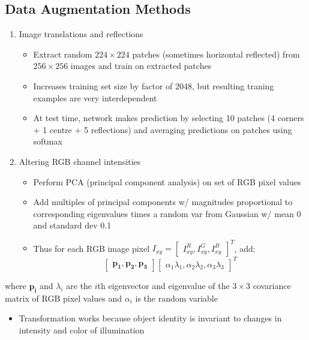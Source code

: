 \documentclass[a4paper,12pt]{article}
\newcommand{\vect}[1]{\mathbf{#1}}
\begin{document}
\subsection{Data Augmentation Methods}
\begin{enumerate}
  \item Image translations and reflections
  \begin{itemize}
    \item Extract random $224\times 224$ patches (sometimes horizontal reflected) from $256\times 256$ images and train on extracted patches
    \item Increases training set size by factor of 2048, but resulting traning examples are very interdependent
    \item At test time, network makes prediction by selecting 10 patches (4 corners + 1 centre + 5 reflections) and averaging predictions on patches using softmax
  \end{itemize}
  \item Altering RGB channel intensities
  \begin{itemize}
    \item Perform PCA (principal component analysis) on set of RGB pixel values
    \item Add multiples of principal components w/ magnitudes proportional to corresponding eigenvalues times a random var from Gaussian w/ mean 0 and standard dev 0.1
    \item Thus for each RGB image pixel $I_{xy} = \begin{bmatrix}I^R_{xy}, I^G_{xy}, I^B_{xy}\end{bmatrix}^T$, add:
    \begin{equation}
      \begin{bmatrix}
        \vect{p_1}, \vect{p_2}, \vect{p_3}
      \end{bmatrix}
      \begin{bmatrix}
        \alpha_1\lambda_1, \alpha_2\lambda_2, \alpha_3\lambda_3
      \end{bmatrix}^T
    \end{equation}
  \end{itemize}
\end{enumerate}
where $\vect{p_i}$ and $\lambda_{i}$ are the $i$th eigenvector and eigenvalue of the $3\times 3$ covariance matrix of RGB pixel values and $\alpha_i$ is the random variable
\begin{itemize}
  \item Transformation works because object identity is invariant to changes in intensity and color of illumination
\end{itemize}
\end{document}
